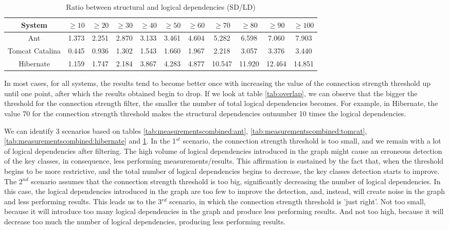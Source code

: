 \documentclass[runningheads]{comsis2}
\begin{document}
\begin{table}[!h]
\setlength\tabcolsep{3.5pt}
\caption{Ratio between structural and logical dependencies (SD/LD)}
\label{tab:ratio_sd_ld}
\centering
\begin{tabular}{|c|cccccccccc|}
\hline
System &	$\geq10$	&	$\geq20$		&	$\geq30$		&	$\geq40$		&	$\geq50$		&	$\geq60$		&	$\geq70$		&	$\geq80$		&	$\geq90$		&	$\geq100$ \\

\hline
Ant	&	1.373	&	2.251	&	2.870	&	3.133	&	3.461	&	4.604	&	5.282	&	6.598	&	7.060	&	7.903	\\
Tomcat Catalina	&	0.445	&	0.936	&	1.302	&	1.543	&	1.660	&	1.967	&	2.218	&	3.057	&	3.376	&	3.440	\\
Hibernate	&	1.159	&	1.747	&	2.184	&	3.867	&	4.283	&	4.877	&	10.547	&	11.920	&	12.464	&	14.851	\\

\hline
\end{tabular}
\end{table}

In most cases, for all systems, the results tend to become better once with increasing the value of the connection strength threshold up until one point, after which the results obtained begin to drop.
If we look at table \ref{tab:overlap}, we can observe that the bigger the threshold for the connection strength filter, the smaller the number of total logical dependencies becomes. For example, in Hibernate, the value 70 for the connection strength threshold makes the structural dependencies outnumber 10 times the logical dependencies. 

We can identify 3 scenarios based on tables \ref{tab:measurementscombined:ant}, \ref{tab:measurementscombined:tomcat}, \ref{tab:measurementscombined:hibernate} and \ref{tab:ratio_sd_ld}. In the 1$^{st}$ scenario, the connection strength threshold is too small, and we remain with a lot of logical dependencies after filtering. The high volume of logical dependencies introduced in the graph might cause an erroneous detection of the key classes, in consequence, less performing measurements/results. This affirmation is sustained by the fact that, when the threshold begins to be more restrictive, and the total number of logical dependencies begins to decrease, the key classes detection starts to improve.
The 2$^{nd}$ scenario assumes that the connection strength threshold is too big, significantly decreasing the number of logical dependencies. In this case, the logical dependencies introduced in the graph are too few to improve the detection, and, instead, will create noise in the graph and less performing results.
This leads us to the 3$^{rd}$ scenario, in which the connection strength threshold is 'just right'. Not too small, because it will introduce too many logical dependencies in the graph and produce less performing results. And not too high, because it will decrease too much the number of logical dependencies, producing less performing results. 
\end{document}

